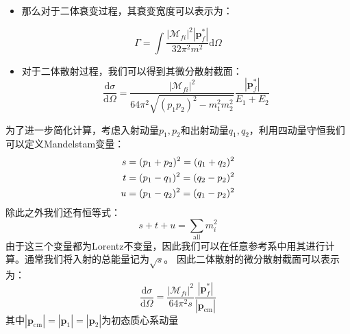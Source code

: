 \begin{itemize}
	\item 那么对于二体衰变过程，其衰变宽度可以表示为：
\end{itemize}
\begin{equation}
\Gamma=\int\frac{|\mathcal{M}_{fi}|^2|\boldsymbol{p}^*_f|}{32\pi^2m^2}\mathrm{d}\Omega
\end{equation}
\begin{itemize}
	\item 对于二体散射过程，我们可以得到其微分散射截面：
	\begin{equation}
	\frac{\mathrm{d}\sigma}{\mathrm{d}\Omega}=\frac{ |\mathcal{M}_{fi}|^2}{64\pi^2\sqrt{(p_1p_2)^2-m_1^2m_2^2}}\frac{|\boldsymbol{p}^*_f|}{E_1+E_2}
	\label{eq:difxsec}
	\end{equation}
\end{itemize}
为了进一步简化计算，考虑入射动量$p_1,p_2$和出射动量$q_1,q_2$，利用四动量守恒我们可以定义Mandelstam变量：
\begin{align}
s&=(p_1+p_2)^2=(q_1+q_2)^2\notag\\
t&=(p_1-q_1)^2=(q_2-p_2)^2\notag\\
u&=(p_1-q_2)^2=(q_1-p_2)^2
\label{eq:mdstv}
\end{align}
除此之外我们还有恒等式：
\begin{equation}
s+t+u=\sum_{\text{all}}m_i^2
\label{eq:madsum}
\end{equation}
由于这三个变量都为Lorentz不变量，因此我们可以在任意参考系中用其进行计算。通常我们将入射的总能量记为$\sqrt{s}$。
因此二体散射的微分散射截面可以表示为：
\begin{equation}
\frac{\mathrm{d}\sigma}{\mathrm{d}\Omega}=\frac{|\mathcal{M}_{fi}|^2}{64\pi^2 s}\frac{|\boldsymbol{p}_f^*|}{|\boldsymbol{p}_\mathrm{cm}|}%
\label{eq:difxsec2}
\end{equation}
其中$|\boldsymbol{p}_\mathrm{cm}|=|\boldsymbol{p}_1|=|\boldsymbol{p}_2|$为初态质心系动量

